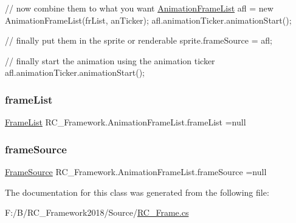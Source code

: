 // now combine them to what you want \mbox{\hyperlink{class_r_c___framework_1_1_animation_frame_list}{Animation\+Frame\+List}} afl = new Animation\+Frame\+List(fr\+List, an\+Ticker); afl.\+animation\+Ticker.\+animation\+Start();

// finally put them in the sprite or renderable sprite.\+frame\+Source = afl;

// finally start the animation using the animation ticker afl.\+animation\+Ticker.\+animation\+Start();\mbox{\label{class_r_c___framework_1_1_animation_frame_list_a138734a263190761b0da537fb830f2a9}} 
\subsubsection{\texorpdfstring{frame\+List}{frameList}}
{\footnotesize\ttfamily \mbox{\hyperlink{class_r_c___framework_1_1_frame_list}{Frame\+List}} R\+C\+\_\+\+Framework.\+Animation\+Frame\+List.\+frame\+List =null\hspace{0.3cm}{\ttfamily [protected]}}

\mbox{\label{class_r_c___framework_1_1_animation_frame_list_a3dd60d9e75ce6498504a04894f8626bc}} 
\subsubsection{\texorpdfstring{frame\+Source}{frameSource}}
{\footnotesize\ttfamily \mbox{\hyperlink{class_r_c___framework_1_1_frame_source}{Frame\+Source}} R\+C\+\_\+\+Framework.\+Animation\+Frame\+List.\+frame\+Source =null}



The documentation for this class was generated from the following file\+:\begin{DoxyCompactItemize}
\item 
F\+:/\+B/\+R\+C\+\_\+\+Framework2018/\+Source/\mbox{\hyperlink{_r_c___frame_8cs}{R\+C\+\_\+\+Frame.\+cs}}\end{DoxyCompactItemize}

